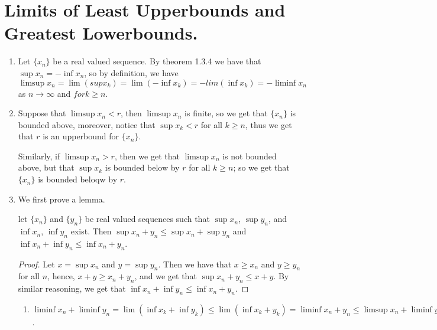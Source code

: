 
\section{Limits of Least Upperbounds and Greatest Lowerbounds.}

\begin{enumerate}[label=(\arabic*)]
    \item[(2)] Let $\{x_n\}$ be a real valued sequence. By theorem 1.3.4 we have 
        that $\sup{x_n}=-\inf{x_n}$, so by definition, we have  $\limsup{x_n}=
        \lim{(sup{x_k})}=\lim{(-\inf{x_k})}=-lim{(\inf{x_k})}=-\liminf{x_n}$ as 
        $n\rightarrow \infty$ and  $for k \geq n$.

    \item[(3)] Suppose that  $\limsup{x_n}<r$, then  $\limsup{x_n}$ is finite, 
        so we get that $\{x_n\}$ is bounded above, moreover, notice that $\sup{x_k}<r$ 
        for all  $k \geq n$, thus we get that $r$ is an upperbound for $\{x_n\}$.

        Similarly, if $\limsup{x_n}>r$, then we get that  $\limsup{x_n}$ is not 
        bounded above, but that  $\sup{x_k}$ is bounded below by  $r$ for all $k \geq n$; 
        so we get that $\{x_n\}$ is bounded beloqw by  $r$.

    \item[(4)] We first prove a lemma.
         \begin{lemma}\label{lemma}
             let $\{x_n\}$ and $\{y_n\}$ be real valued sequences such that $\sup{x_n}$, 
             $\sup{y_n}$, and $\inf{x_n}$, $\inf{y_n}$ exist. Then $\sup{x_n+y_n} \leq 
             \sup{x_n}+\sup{y_n}$ and $\inf{x_n}+\inf{y_n} \leq \inf{x_n+y_n}$.
        \end{lemma}
        \begin{proof}
            Let $x=\sup{x_n}$ and $y=\sup{y_n}$. Then we have that $x \geq x_n$ 
            and $y \geq y_n$ for all  $n$, hence, $x+y \geq x_n+y_n$, and we get 
            that  $\sup{x_n+y_n} \leq x+ y$. By similar reasoning, we get that 
            $\inf{x_n}+\inf{y_n} \leq \inf{x_n+y_n}$.
        \end{proof}

        \begin{enumerate}
            \item $\liminf{x_n}+\liminf{y_n}=\lim{(\inf{x_k}+\inf{y_k})} \leq 
                \lim{(\inf{x_k+y_k})}=\liminf{x_n+y_n} \leq \limsup{x_n}+\liminf{y_n} 
                \leq \limsup{x_n+y_n} \leq \limsup{x_n}+\limsup{y_n}$.


\end{enumerate}
\end{enumerate}
